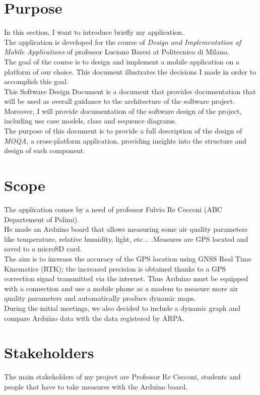 \section{Purpose}
In this section, I want to introduce briefly my application.\\

The application is developed for the course of \textit{Design and Implementation of Mobile
Applications} of professor Luciano Baresi at Politecnico di Milano.\\
The goal of the course is to design and implement a mobile application on a platform of our choice.
This document illustrates the decisions I made in order to accomplish this goal.\\

This Software Design Document is a document that provides documentation that will be
used as overall guidance to the architecture of the software project. Moreover, I will
provide documentation of the software design of the project, including use case models,
class and sequence diagrams.\\

The purpose of this document is to provide a full description of the design of \textit{MOQA}, a cross-platform application, providing insights into the structure and design of each component.

\section{Scope}
The application comes by a need of professor Fulvio Re Cecconi (ABC Departement of Polimi).\\
He made an Arduino board that allows measuring some
air quality parameters like temperature, relative humidity, light, etc... .Measures are GPS located and saved to a microSD card.\\

The aim is to increase the accuracy of the GPS location using GNSS Real Time Kinematics (RTK); the increased precision is obtained thanks to a GPS correction signal transmitted via the internet. Thus Arduino must be equipped with a connection and use a mobile phone as a modem to measure more air quality parameters and automatically produce dynamic maps.\\

During the initial meetings, we also decided to include a dynamic graph and compare Arduino data with the data registered by ARPA.

\section{Stakeholders}
The main stakeholders of my project are Professor Re Cecconi, students and people that have to take measures with the Arduino board.\\

